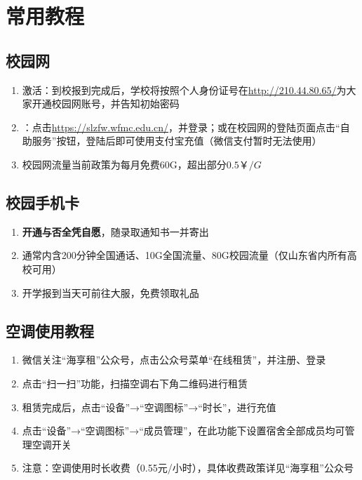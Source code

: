 \chapter[常用教程]{常用教程}

\section[校园网]{校园网}
\begin{enumerate}
    \item 激活：到校报到完成后，学校将按照个人身份证号在\uline{\href{http://210.44.80.65/}{http://210.44.80.65/}}为大家开通校园网账号，并告知初始密码\footnotemark
    \item \textbf{}：点击\uline{\href{https://slzfw.wfmc.edu.cn/}{https://slzfw.wfmc.edu.cn/}}，并登录；或在校园网的登陆页面点击“自助服务”按钮\footnotemark，登陆后即可使用支付宝充值（微信支付暂时无法使用）
    \item 校园网流量当前政策为每月免费60G，超出部分$0.5￥/G$
\end{enumerate}

\section[校园手机卡]{校园手机卡}
\begin{enumerate}
    \item \textbf{开通与否全凭自愿}，随录取通知书一并寄出
    \item 通常内含200分钟全国通话、10G全国流量、80G校园流量（仅山东省内所有高校可用）
    \item 开学报到当天可前往大服，免费领取礼品
\end{enumerate}

\section[空调使用教程]{空调使用教程}
\begin{enumerate}
    \item 微信关注“海享租”公众号，点击公众号菜单“在线租赁”，并注册、登录
    \item 点击“扫一扫”功能，扫描空调右下角二维码进行租赁
    \item 租赁完成后，点击“设备”→“空调图标”→“时长”，进行充值
    \item 点击“设备”→“空调图标”→“成员管理”，在此功能下设置宿舍全部成员均可管理空调开关
    \item 注意：空调使用时长收费（0.55元/小时），具体收费政策详见“海享租”公众号
\end{enumerate}

